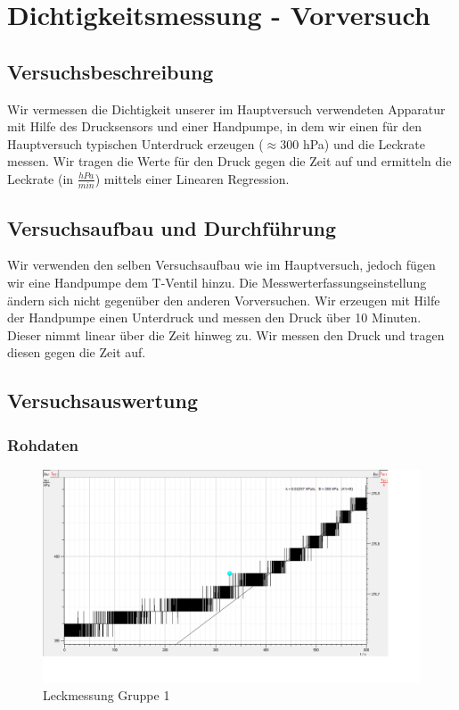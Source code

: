 \documentclass[12pt,a4paper]{article}
\author{Gruppe C14 \\ Julián Häck, Martin Koytek, Lars Wenning, Erik Zimmermann}
\begin{document}
\section{Dichtigkeitsmessung - Vorversuch}
\subsection{Versuchsbeschreibung}
Wir vermessen die Dichtigkeit unserer im Hauptversuch verwendeten Apparatur mit Hilfe des Drucksensors und einer Handpumpe, in dem wir einen für den Hauptversuch typischen Unterdruck erzeugen ($\approx$300 hPa) und die Leckrate messen. Wir tragen die Werte für den Druck gegen die Zeit auf und ermitteln die Leckrate (in $\frac{hPa}{min}$) mittels einer Linearen Regression.

\subsection{Versuchsaufbau und Durchführung}
Wir verwenden den selben Versuchsaufbau wie im Hauptversuch, jedoch fügen wir eine Handpumpe dem T-Ventil hinzu. Die Messwerterfassungseinstellung ändern sich nicht gegenüber den anderen Vorversuchen.
Wir erzeugen mit Hilfe der Handpumpe einen Unterdruck und messen den Druck über 10 Minuten. Dieser nimmt linear über die Zeit hinweg zu. Wir messen den Druck und tragen diesen gegen die Zeit auf.
\subsection{Versuchsauswertung}

\subsubsection{Rohdaten}

\begin{figure}[H]
\centering
\includegraphics[scale=0.3]{Bilder/dichtigkeit_raw_JM.png}
\caption{Leckmessung Gruppe 1}
\end{figure}
\end{document}
